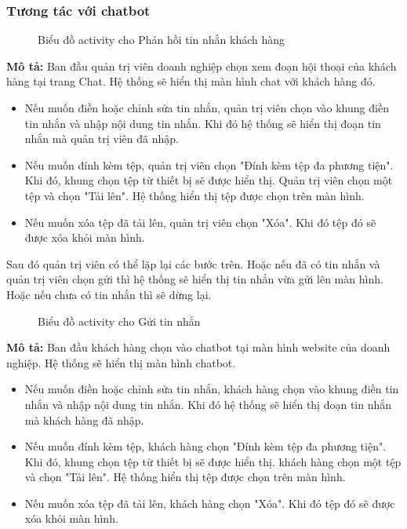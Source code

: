 \subsubsection{Tương tác với chatbot}
\begin{figure}[H]
    \centering
     
    \vspace{0.5cm}
    \caption{Biểu đồ activity cho Phản hồi tin nhắn khách hàng}
    \label{fig:enter-label}
\end{figure}
\textbf{Mô tả:}
Ban đầu quản trị viên doanh nghiệp chọn xem đoạn hội thoại của khách hàng tại trang Chat. Hệ thống sẽ hiển thị màn hình chat với khách hàng đó.
\begin{itemize}
    \item Nếu muốn điền hoặc chỉnh sửa tin nhắn, quản trị viên chọn vào khung điền tin nhắn và nhập nội dung tin nhắn. Khi đó hệ thống sẽ hiển thị đoạn tin nhắn mà quản trị viên đã nhập.
    \item Nếu muốn đính kèm tệp, quản trị viên chọn "Đính kèm tệp đa phương tiện". Khi đó, khung chọn tệp từ thiết bị sẽ được hiển thị. Quản trị viên chọn một tệp và chọn "Tải lên". Hệ thống hiển thị tệp được chọn trên màn hình.
    \item Nếu muốn xóa tệp đã tải lên, quản trị viên chọn "Xóa". Khi đó tệp đó sẽ được xóa khỏi màn hình.
\end{itemize}
Sau đó quản trị viên có thể lặp lại các bước trên. Hoặc nếu đã có tin nhắn và quản trị viên chọn gửi thì hệ thống sẽ hiển thị tin nhắn vừa gửi lên màn hình. Hoặc nếu chưa có tin nhắn thì sẽ dừng lại.
\begin{figure}[H]
    \centering
     
    \vspace{0.5cm}
    \caption{Biểu đồ activity cho Gửi tin nhắn}
    \label{fig:enter-label}
\end{figure}
\textbf{Mô tả:}
Ban đầu khách hàng chọn vào chatbot tại màn hình website của doanh nghiệp. Hệ thống sẽ hiển thị màn hình chatbot.
\begin{itemize}
    \item Nếu muốn điền hoặc chỉnh sửa tin nhắn, khách hàng chọn vào khung điền tin nhắn và nhập nội dung tin nhắn. Khi đó hệ thống sẽ hiển thị đoạn tin nhắn mà khách hàng đã nhập.
    \item Nếu muốn đính kèm tệp, khách hàng chọn "Đính kèm tệp đa phương tiện". Khi đó, khung chọn tệp từ thiết bị sẽ được hiển thị. khách hàng chọn một tệp và chọn "Tải lên". Hệ thống hiển thị tệp được chọn trên màn hình.
    \item Nếu muốn xóa tệp đã tải lên, khách hàng chọn "Xóa". Khi đó tệp đó sẽ được xóa khỏi màn hình.
\end{itemize}
